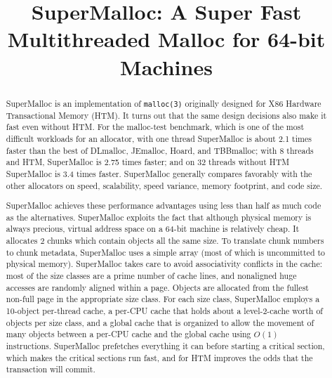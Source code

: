 \documentclass[natbib,sort&compress,10pt]{sigplanconf}
\begin{document}
\setlength{\pdfpageheight}{\paperheight}
\setlength{\pdfpagewidth}{\paperwidth}

\title{SuperMalloc: A Super Fast Multithreaded Malloc for 64-bit Machines}
\date{}
\maketitle
\begin{abstract}

SuperMalloc is an implementation of \texttt{malloc(3)} originally
designed for X86 Hardware Transactional Memory (HTM)\@.  It turns out
that the same design decisions also make it fast even without HTM\@.
For the malloc-test benchmark, which is one of the most difficult
workloads for an allocator, with one thread SuperMalloc is about 2.1
times faster than the best of DLmalloc, JEmalloc, Hoard, and
TBBmalloc; with 8 threads and HTM, SuperMalloc is 2.75 times faster;
and on 32 threads without HTM SuperMalloc is 3.4 times faster.
SuperMalloc generally compares favorably with the other allocators on
speed, scalability, speed variance, memory footprint, and code size.

SuperMalloc achieves these performance advantages using less than half
as much code as the alternatives.  SuperMalloc exploits the fact that
although physical memory is always precious, virtual address space on
a 64-bit machine is relatively cheap.  It allocates
\unit{2}\mebi\byte{} chunks which contain objects all the same size.
To translate chunk numbers to chunk metadata, SuperMalloc uses a
simple array (most of which is uncommitted to physical memory).
SuperMalloc takes care to avoid associativity conflicts in the cache:
most of the size classes are a prime number of cache lines, and
nonaligned huge accesses are randomly aligned within a page.  Objects
are allocated from the fullest non-full page in the appropriate size
class.  For each size class, SuperMalloc employs a 10-object
per-thread cache, a per-CPU cache that holds about a level-2-cache
worth of objects per size class, and a global cache that is organized
to allow the movement of many objects between a per-CPU cache and the
global cache using $O(1)$ instructions.  SuperMalloc prefetches
everything it can before starting a critical section, which makes the
critical sections run fast, and for HTM improves the odds that the
transaction will commit.

\end{abstract}
\end{document}
